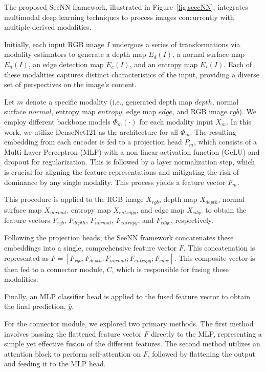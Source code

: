 The proposed SeeNN framework, illustrated in Figure~\ref{fig:seeeNN}, integrates multimodal deep learning techniques to process images concurrently with multiple derived modalities.

Initially, each input RGB image \( I \) undergoes a series of transformations via modality estimators to generate a depth map \( E_d(I) \), a normal surface map \( E_n(I) \), an edge detection map \( E_e(I) \), and an entropy map \( E_s(I) \). Each of these modalities captures distinct characteristics of the input, providing a diverse set of perspectives on the image's content.

Let $m$ denote a specific modality (i.e., generated depth map $depth$, normal surface $normal$, entropy map $entropy$, edge map $edge$, and RGB image $rgb$). We employ different backbone models $\Phi_{m}(\cdot)$ for each modality input $X_m$. In this work, we utilize DenseNet121 \cite{huang_densely_2018} as the architecture for all $\Phi_{m}$. The resulting embedding from each encoder is fed to a projection head $P_m$, which consists of a Multi-Layer Perceptron (MLP) with a non-linear activation function (GeLU) and dropout for regularization. This is followed by a layer normalization step, which is crucial for aligning the feature representations and mitigating the risk of dominance by any single modality. This process yields a feature vector \( F_m \).

This procedure is applied to the RGB image $X_{rgb}$, depth map \( X_{depth} \), normal surface map \( X_{normal} \), entropy map \( X_{entropy} \), and edge map \( X_{edge} \) to obtain the feature vectors $F_{rgb}$, $F_{depth}$, $F_{normal}$, $F_{entropy}$, and $F_{edge}$, respectively.

Following the projection heads, the SeeNN framework concatenates these embeddings into a single, comprehensive feature vector \( F \). This concatenation is represented as \( F = [F_{rgb}, F_{depth}; F_{normal}; F_{entropy}; F_{edge}] \). This composite vector is then fed to a connector module, $C$, which is responsible for fusing these modalities.

Finally, an MLP classifier head is applied to the fused feature vector to obtain the final prediction, $\hat{y}$.

For the connector module, we explored two primary methods. The first method involves passing the flattened feature vector \( F \) directly to the MLP, representing a simple yet effective fusion of the different features. The second method utilizes an attention block to perform self-attention on \( F \), followed by flattening the output and feeding it to the MLP head.

